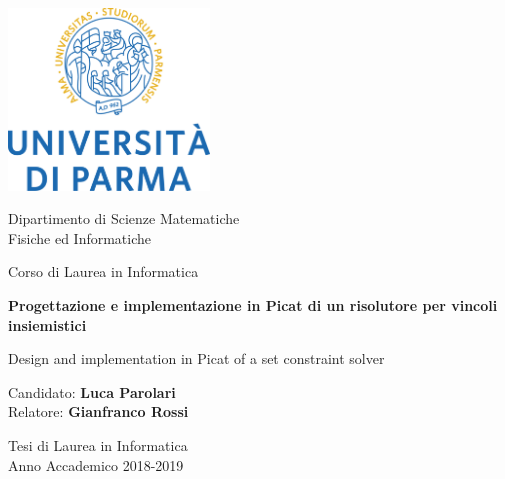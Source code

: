\documentclass[12pt,a4paper,openright]{book} %
\begin{document}
\begin{titlepage}
    \begin{center}
        \includegraphics[width=0.4\textwidth]{img/logo_unipr.png}

		\vspace{0.5cm}

		\Large
        Dipartimento di Scienze Matematiche\\
        Fisiche ed Informatiche

        \vspace{0.5cm}

        \Large
        Corso di Laurea in Informatica

		\vspace{1.2cm}

        \Huge
        \textbf{Progettazione e implementazione in Picat di un risolutore
          per vincoli insiemistici}

        \vspace{1cm}
        \LARGE
        Design and implementation in Picat of a set constraint solver

        \vspace{1.2cm}

		\large Candidato: \Large\textbf{Luca Parolari}\\
		\large Relatore: \Large\textbf{Gianfranco Rossi}


        \vfill

 		\large
        Tesi di Laurea in Informatica\\
        Anno Accademico 2018-2019

    \end{center}
\end{titlepage}
\end{document}
